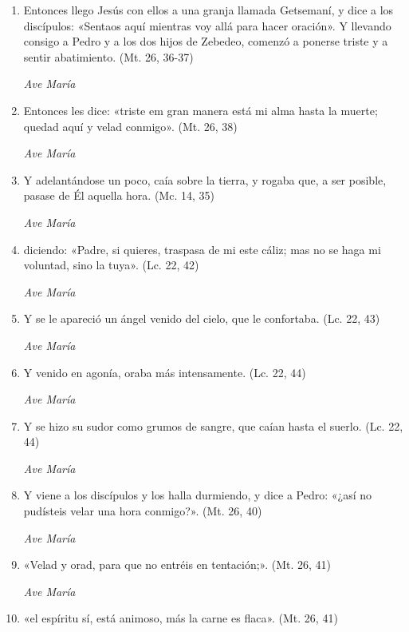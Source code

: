 \documentclass[a4paper,11pt, oneside]{report}
\begin{document}
      \begin{enumerate}

        \item Entonces llego Jesús con ellos a una granja llamada Getsemaní, y dice a los discípulos: «Sentaos aquí mientras voy allá para hacer oración». 
        Y llevando consigo a Pedro y a los dos hijos de Zebedeo, comenzó a ponerse triste y a sentir abatimiento. (Mt. 26, 36-37)

        \textit{Ave María}

        \item Entonces les dice: «triste em gran manera está mi alma hasta la muerte; quedad aquí y velad conmigo». (Mt. 26, 38)

        \textit{Ave María}

        \item Y adelantándose un poco, caía sobre la tierra, y rogaba que, a ser posible, pasase de Él aquella hora. (Mc. 14, 35)

        \textit{Ave María}

        \item diciendo: «Padre, si quieres, traspasa de mi este cáliz; mas no se haga mi voluntad, sino la tuya». (Lc. 22, 42)

        \textit{Ave María}

        \item Y se le apareció un ángel venido del cielo, que le confortaba. (Lc. 22, 43)

        \textit{Ave María}

        \item Y venido en agonía, oraba más intensamente. (Lc. 22, 44)

        \textit{Ave María}

        \item Y se hizo su sudor como grumos de sangre, que caían hasta el suerlo. (Lc. 22, 44)

        \textit{Ave María}

        \item Y viene a los discípulos y los halla durmiendo, y dice a Pedro: «¿así no pudísteis velar una hora conmigo?». (Mt. 26, 40)

        \textit{Ave María}

        \item «Velad y orad, para que no entréis en tentación;». (Mt. 26, 41)

        \textit{Ave María}

        \item «el espíritu sí, está animoso, más la carne es flaca». (Mt. 26, 41)

      \end{enumerate}
\end{document}
